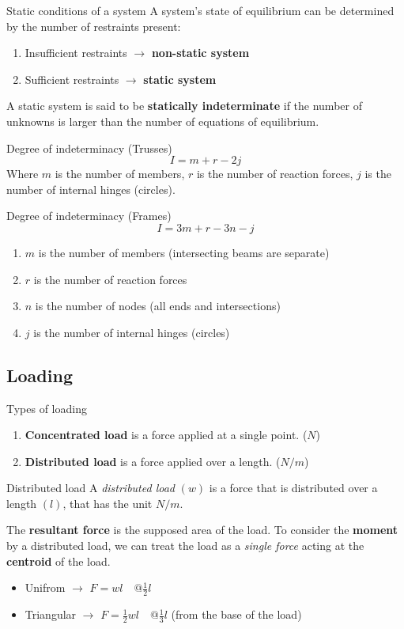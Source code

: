 \begin{definition}
    {Static conditions of a system}
    A system's state of equilibrium can be determined by the number of restraints present:
    \begin{enumerate}
        \item Insufficient restraints $\to$ \textbf{non-static system}
        \item Sufficient restraints $\to$ \textbf{static system}
    \end{enumerate}
    A static system is said to be \textbf{statically indeterminate} if the number of unknowns is larger than the number of equations of equilibrium.
\end{definition}
\begin{theorem}
    {Degree of indeterminacy (Trusses)}
    \[I=m+r-2j\]
    Where $m$ is the number of members, $r$ is the number of reaction forces, $j$ is the number of internal hinges (circles).
\end{theorem}
\begin{theorem}
    {Degree of indeterminacy (Frames)}
    \[I=3m+r-3n-j\]
    \begin{enumerate}
        \item $m$ is the number of members (intersecting beams are separate)
        \item $r$ is the number of reaction forces
        \item $n$ is the number of nodes (all ends and intersections)
        \item $j$ is the number of internal hinges (circles)
    \end{enumerate}
\end{theorem}

\subsection{Loading}
\begin{knBox}
    {Types of loading}
    \begin{enumerate}
        \item \textbf{Concentrated load} is a force applied at a single point. ($N$)
        \item \textbf{Distributed load} is a force applied over a length. ($N/m$)
    \end{enumerate}
\end{knBox}
\begin{theorem}
    {Distributed load}
    A \emph{distributed load} $(w)$ is a force that is distributed over a length $(l)$, that has the unit $N/m$.

    The \textbf{resultant force} is the supposed area of the load. To consider the \textbf{moment} by a distributed load, we can treat the load as a \emph{single force} acting at the \textbf{centroid} of the load.
    \begin{itemize}
        \item Unifrom $\to$ $F=wl\quad @\frac{1}{2}l$
        \item Triangular $\to$ $F=\frac{1}{2}wl\quad @ \frac{1}{3}l$  (from the base of the load)
    \end{itemize}
\end{theorem}

